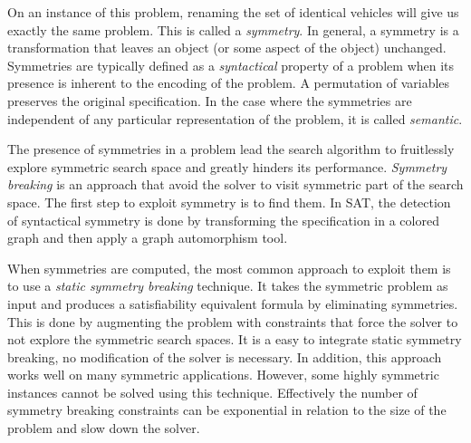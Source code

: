 On an instance of this problem, renaming the set of identical vehicles will give us exactly the same problem.
This is called a \textit{symmetry}. In general, a symmetry is a transformation that leaves an object (or some aspect of the object) unchanged. Symmetries are typically defined as a \textit{syntactical} property of a problem when its presence is inherent to the encoding of the problem. A permutation of variables preserves the original specification. In the case where the symmetries are independent of any 
particular representation of the problem, it is called \textit{semantic}.


The presence of symmetries in a problem lead the search algorithm to fruitlessly explore symmetric
search space and greatly hinders its performance. \textit{Symmetry breaking} is an approach that
avoid the solver to visit symmetric part of the search space. The first step to exploit symmetry is to find them.
In SAT, the detection of syntactical symmetry is done by transforming the specification
in a colored graph and then apply a graph automorphism tool.





%
%
%
%
%
%
%
%
%



When symmetries are computed, the most common approach to exploit them is to use a \emph{static symmetry breaking} technique.
It takes the symmetric problem as input and produces a satisfiability equivalent formula by eliminating symmetries. This is done by augmenting the problem with constraints that force the solver to not explore the symmetric search  spaces. It is a easy to integrate static symmetry breaking, no modification of the solver is necessary.
In addition, this approach works well on many symmetric applications.
However, some highly symmetric instances cannot be solved using this technique. Effectively the number of
symmetry breaking constraints can be exponential in relation to the size of the problem and slow down the solver.




